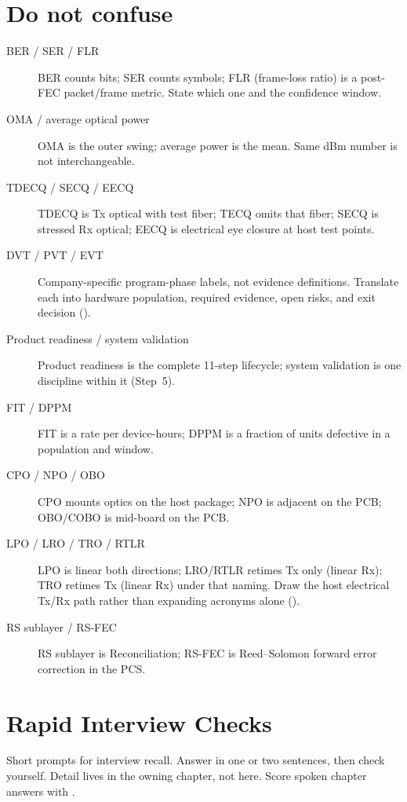 \section{Do not confuse}
\label{sec:glossary-confuse}
\begin{description}
\item[BER / SER / FLR] BER counts bits; SER counts symbols; FLR (frame-loss ratio) is a post-FEC packet/frame metric. State which one and the confidence window.
\item[OMA / average optical power] OMA is the outer swing; average power is the mean. Same dBm number is not interchangeable.
\item[TDECQ / SECQ / EECQ] TDECQ is Tx optical with test fiber; TECQ omits that fiber; SECQ is stressed Rx optical; EECQ is electrical eye closure at host test points.
\item[DVT / PVT / EVT] Company-specific program-phase labels, not evidence definitions. Translate each into hardware population, required evidence, open risks, and exit decision ().
\item[Product readiness / system validation] Product readiness is the complete 11-step lifecycle; system validation is one discipline within it (Step~5).
\item[FIT / DPPM] FIT is a rate per device-hours; DPPM is a fraction of units defective in a population and window.
\item[CPO / NPO / OBO] CPO mounts optics on the host package; NPO is adjacent on the PCB; OBO/COBO is mid-board on the PCB.
\item[LPO / LRO / TRO / RTLR] LPO is linear both directions; LRO/RTLR retimes Tx only (linear Rx); TRO retimes Tx (linear Rx) under that naming. Draw the host electrical Tx/Rx path rather than expanding acronyms alone ().
\item[RS sublayer / RS-FEC] RS sublayer is Reconciliation; RS-FEC is Reed--Solomon forward error correction in the PCS.
\end{description}

\section{Rapid Interview Checks}
\label{sec:glossary-rapid-checks}

Short prompts for interview recall. Answer in one or two sentences, then check
yourself. Detail lives in the owning chapter, not here. Score spoken chapter
answers with .

